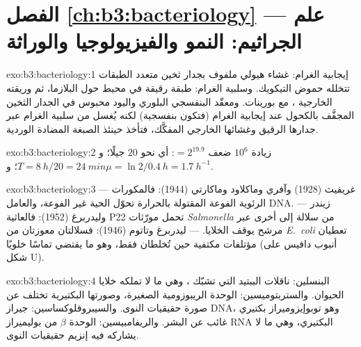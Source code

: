 \section*{الفصل \ref{ch:b3:bacteriology} --- علم الجراثيم: النمو والفيزيولوجيا والوراثة}

\begin{solution}{exo:b3:bacteriology:1}
إيجابية الغرام: غشاء هيولي ملفوف بجدار  ثخين
متعدد الطبقات تتخلله حموض التيكويك. وسلبية الغرام: طبقة
 رقيقة في محيط حول البلازما، ثم  وريقته
الخارجية ، مع بورينات. ومعقّد البنفسجي البلوري واليود
محبوس في الجدار الثخين المجفَّف بالكحول عند
إيجابية الغرام (فتكون بنفسجية) لكنه يُغسل من سلبية الغرام عبر جدارها
الرقيق وغشائها الخارجي المفكَّك، فتأخذ حينئذ الصبغة
المضادة الوردية.
\end{solution}

\begin{solution}{exo:b3:bacteriology:2}
زيادة $10^{6}$ ضعف $= 2^{19.9}$: أي نحو $20$ جيلًا؛ و$T = \qty{8}{h}/20
= \qty{24}{min}$؛ و$\mu = \ln 2/\qty{0.4}{h} = \qty{1.7}{h^{-1}}$.
\end{solution}

\begin{solution}{exo:b3:bacteriology:3}
 --- غريفيث (1928) وآفري وماكلاود وماكارتي
(1944): فالمكورات الرئوية الفوعة المقتولة بالحرارة تحوّل
الحية غير الفوعة، والعامل DNA.  --- زيندر وليدربرغ
(1952): فالعاثية P22 تحمل مورّثات \emph{Salmonella} من سلالة إلى
أخرى عبر مرشح يوقف الخلايا.  --- ليدربرغ
وتاتوم (1946): فسلالتان معوزتان من \emph{E.~coli} تعطيان
مؤتلفات مكتفية حين تُخلطان فقط، وهو ما يقتضي تماسًا خلويًا
(أنبوب دافيس على شكل U).
\end{solution}

\begin{solution}{exo:b3:bacteriology:4}
البنسلين: ناقلات الببتيد التي تشبّك ، وهي ما
لا تملكه خلايا الحيوان. والستربتوميسين: الوحدة الريبوزومية الصغيرة،
وصورتها البكتيرية تختلف عن صورة حقيقيات النوى. والسيبروفلوكساسين: جيراز
DNA، وهو توبوإيزوميراز بكتيري غائب عن البشر. والريفامبيسين:
الوحدة $\beta$ من بوليميراز RNA البكتيري، وهي ما لا يشاركه فيه
إنزيم حقيقيات النوى.
\end{solution}

